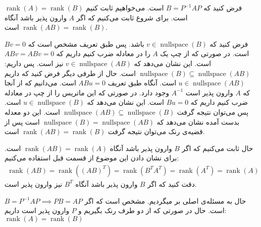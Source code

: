 \documentclass[]{article}
\begin{document}
{
	\thispagestyle{fancy}
	\fancyhf{}
	\fancyfoot{}
	\cfoot{\thepage}
	\renewcommand{\headrulewidth}{2pt}
	\KashidaOff
}
\noindent %
فرض کنید که
$B = P^{-1}AP$
است. می‌خواهیم ثابت کنیم
$\operatorname{rank}(A) = \operatorname{rank}(B)$
است. برای شروع ثابت می‌کنیم که اگر
$A$
وارون پذیر باشد آنگاه
$\operatorname{rank}(AB) = \operatorname{rank}(B)$
است.

\noindent
فرض کنید که
$v \in \operatorname{nullspace}(B)$
باشد. پس طبق تعریف مشخص است که
$Bv = 0$
است. در صورتی که از چپ یک
$A$
را در معادله ضرب کنیم داریم که
$ABv = ABv = 0$
است. این نشان می‌‌دهد که
$v \in \operatorname{nullspace}(AB)$
نیز است. پس داریم:
$\operatorname{nullspace}(B) \subseteq \operatorname{nullspace}(AB)$
است. حال از طرفی دیگر فرض کنید که داریم
$u \in \operatorname{nullspace}(AB)$
است. آنگاه طبق تعریف
$ABu = 0$
است. می‌دانیم که از آنجا که
$A$
وارون پذیر است
$A^{-1}$
وجود دارد. در صورتی که این ماتریس را از چپ در معادله ضرب کنیم داریم که
$Bu = 0$
است. این نشان می‌دهد که
$u \in \operatorname{nullspace}(B)$
است. پس می‌توان نتیجه گرفت
$\operatorname{nullspace}(AB) \subseteq \operatorname{nullspace}(B)$
است. این دو معدله بدست آمده نشان می‌دهد که
$\operatorname{nullspace}(B) = \operatorname{nullspace}(AB)$
است پس از قضیه‌ی رنک می‌توان نتیجه گرفت
$\operatorname{rank}(AB) = \operatorname{rank}(B)$
است.

\noindent
حال ثابت می‌کنیم که اگر
$B$
وارون پذیر باشد آنگاه 
$\operatorname{rank}(AB) = \operatorname{rank}(A)$
است. برای نشان دادن این موضوع از قسمت قبل استفاده می‌کنیم:
\begin{gather*}
	\operatorname{rank}(AB) = \operatorname{rank}((AB)^T) = \operatorname{rank}(B^TA^T) = \operatorname{rank}(A^T) = \operatorname{rank}(A)
\end{gather*}
دقت کنید که اگر
$B$
وارون پذیر باشد آنگاه
$B^T$
نیز وارون پذیر است.

\noindent
حال به مسئله‌ی اصلی بر میگردیم. مشخص است که اگر
$B = P^{-1}AP \implies PB = AP$
است. حال در صورتی که از دو طرف رنک بگیریم و
$P$
وارون پذیر است داریم:
$\operatorname{rank}(A) = \operatorname{rank}(B)$
\end{document}
